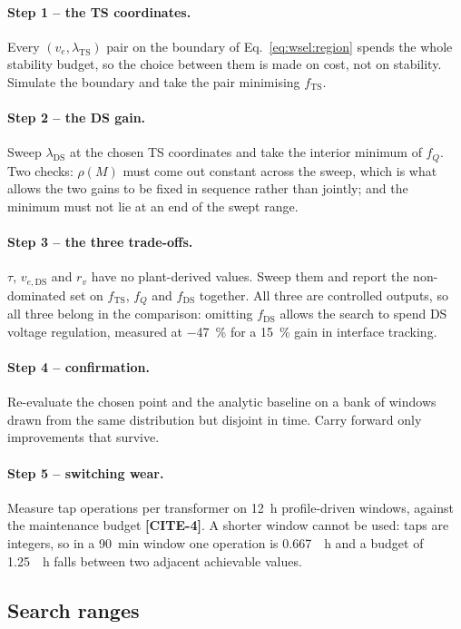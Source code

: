 \documentclass[11pt,a4paper]{article}
\newcommand{\lamts}{\ensuremath{\lambda_{\mathrm{TS}}}}
\newcommand{\lamds}{\ensuremath{\lambda_{\mathrm{DS}}}}
\newcommand{\fts}{\ensuremath{f_{\mathrm{TS}}}}
\newcommand{\fq}{\ensuremath{f_{Q}}}
\newcommand{\fds}{\ensuremath{f_{\mathrm{DS}}}}
\newcommand{\CITE}[1]{\textbf{[CITE-#1]}}
\begin{document}
\paragraph{Step 1 -- the TS coordinates.}
Every $(v_e, \lamts)$ pair on the boundary of Eq.~\eqref{eq:wsel:region} spends
the whole stability budget, so the choice between them is made on cost, not on
stability. Simulate the boundary and take the pair minimising \fts.

\paragraph{Step 2 -- the DS gain.}
Sweep \lamds{} at the chosen TS coordinates and take the interior minimum of
\fq. Two checks: $\rho(M)$ must come out constant across the sweep, which is what
allows the two gains to be fixed in sequence rather than jointly; and the minimum
must not lie at an end of the swept range.

\paragraph{Step 3 -- the three trade-offs.}
$\tau$, $v_{e,\mathrm{DS}}$ and $r_v$ have no plant-derived values. Sweep them
and report the non-dominated set on \fts, \fq{} and \fds{} together. All three
are controlled outputs, so all three belong in the comparison: omitting \fds{}
allows the search to spend DS voltage regulation, measured at \SI{-47}{\percent}
for a \SI{15}{\percent} gain in interface tracking.

\paragraph{Step 4 -- confirmation.}
Re-evaluate the chosen point and the analytic baseline on a bank of windows
drawn from the same distribution but disjoint in time. Carry forward only
improvements that survive.

\paragraph{Step 5 -- switching wear.}
Measure tap operations per transformer on \SI{12}{\hour} profile-driven windows,
against the maintenance budget \CITE{4}. A shorter window cannot be used: taps
are integers, so in a \SI{90}{\minute} window one operation is
\SI{0.667}{\per\hour} and a budget of \SI{1.25}{\per\hour} falls between two
adjacent achievable values.

\subsection{Search ranges}
\label{sec:wsel:ranges}
\end{document}

